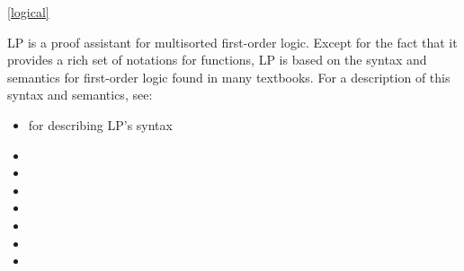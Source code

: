 \ref{logical}

LP is a proof assistant for multisorted first-order logic.  Except for the fact
that it provides a rich set of notations for functions, LP is based on the 
syntax and semantics for first-order logic found in many textbooks.  For a
description of this syntax and semantics, see:

\begin{itemize}
\item {} for describing LP's syntax
\item {}
\item {}
\item {}
\item {}
\item {}
\item {}
\item {}
\end{itemize}
